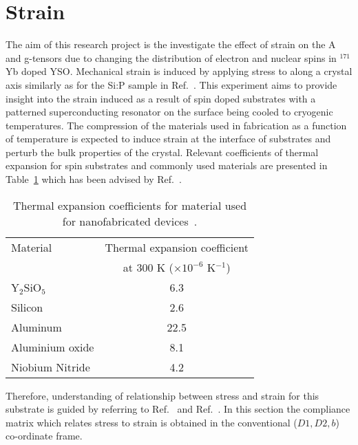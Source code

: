 \section{\label{sec:strain}Strain}
The aim of this research project is the investigate the effect of strain on the A and g-tensors due to changing the distribution of electron and nuclear spins in $^{171}$Yb doped YSO. Mechanical strain is induced by applying stress to along a crystal axis similarly as for the Si:P sample in Ref.~\citep{PhysRevLett.120.167701}. This experiment aims to provide insight into the strain induced as a result of spin doped substrates with a patterned superconducting resonator on the surface being cooled to cryogenic temperatures. The compression of the materials used in fabrication as a function of temperature is expected to induce strain at the interface of substrates and perturb the bulk properties of the crystal. Relevant coefficients of thermal expansion for spin substrates and commonly used materials are presented in Table~\ref{tab:thermalexpansions} which has been advised by Ref.~\citep{mansirthesis}. 

\begin{table}[h]
 \begin{center}
  \caption{Thermal expansion coefficients for material used for nanofabricated devices~\citep{Sato:14,doi:10.1063/1.323747,PhysRev.60.597,1674-1056-21-12-127103}.}
  \label{tab:thermalexpansions}
  \begin{tabular}{l | c}
  \hline
  Material & Thermal expansion coefficient \\
  & at 300 K ($\times 10^{-6}$ K$^{-1}$) \\
  \hline
   Y$_{2}$SiO$_{5}$ & 6.3\\
  Silicon & 2.6\\
  Aluminum & 22.5\\
  Aluminium oxide & 8.1\\
  Niobium Nitride & 4.2\\
  \hline
    \end{tabular}
  \end{center}
\end{table}

Therefore, understanding of relationship between stress and strain for this substrate is guided by referring to Ref.~\citep{doi:10.1002/crat.2170211204} and Ref.~\citep{wooster1973tensors}. In this section the compliance matrix which relates stress to strain is obtained in the conventional ($D1,D2,b$) co-ordinate frame.    

